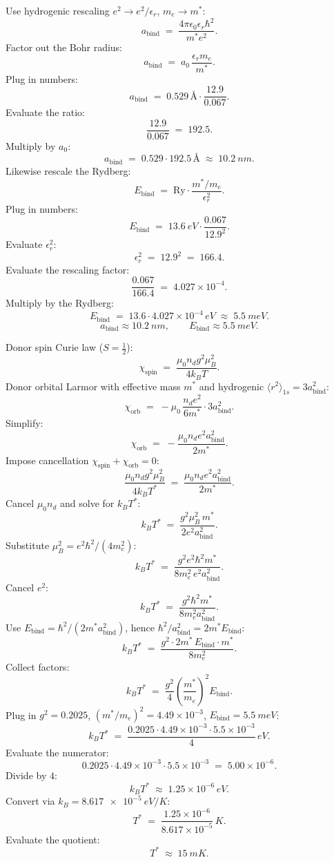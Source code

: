 \documentclass[11pt]{article}
\newcommand{\kB}{k_{B}}
\begin{document}
Use hydrogenic rescaling $e^2\to e^2/\epsilon_r$, $m_e\to m^*$:
\[
a_{\text{bind}} \;=\; \frac{4\pi\epsilon_0\epsilon_r\hbar^2}{m^* e^2}.
\]
Factor out the Bohr radius:
\[
a_{\text{bind}} \;=\; a_0\,\frac{\epsilon_r m_e}{m^*}.
\]
Plug in numbers:
\[
a_{\text{bind}} \;=\; 0.529\,\si{\angstrom}\cdot\frac{12.9}{0.067}.
\]
Evaluate the ratio:
\[
\frac{12.9}{0.067} \;=\; 192.5.
\]
Multiply by $a_0$:
\[
a_{\text{bind}} \;=\; 0.529\cdot 192.5\,\si{\angstrom} \;\approx\; \SI{10.2}{nm}.
\]
Likewise rescale the Rydberg:
\[
E_{\text{bind}} \;=\; \mathrm{Ry}\cdot\frac{m^*/m_e}{\epsilon_r^2}.
\]
Plug in numbers:
\[
E_{\text{bind}} \;=\; \SI{13.6}{eV}\cdot\frac{0.067}{12.9^2}.
\]
Evaluate $\epsilon_r^2$:
\[
\epsilon_r^2 \;=\; 12.9^2 \;=\; 166.4.
\]
Evaluate the rescaling factor:
\[
\frac{0.067}{166.4} \;=\; 4.027\times 10^{-4}.
\]
Multiply by the Rydberg:
\[
E_{\text{bind}} \;=\; 13.6\cdot 4.027\times 10^{-4}\,\si{eV} \;\approx\; \SI{5.5}{meV}.
\]
\begin{equation}
\boxed{\;a_{\text{bind}}\approx\SI{10.2}{nm},\qquad E_{\text{bind}}\approx\SI{5.5}{meV}.\;}
\label{eq:donor}
\end{equation}

Donor spin Curie law ($S=\tfrac12$):
\[
\chi_{\text{spin}} \;=\; \frac{\mu_0 n_d g^2\mu_B^2}{4\kB T}.
\]
Donor orbital Larmor with effective mass $m^*$ and hydrogenic $\langle r^2\rangle_{1s}=3 a_{\text{bind}}^2$:
\[
\chi_{\text{orb}} \;=\; -\mu_0\,\frac{n_d e^2}{6 m^*}\cdot 3 a_{\text{bind}}^2.
\]
Simplify:
\[
\chi_{\text{orb}} \;=\; -\frac{\mu_0 n_d e^2 a_{\text{bind}}^2}{2 m^*}.
\]
Impose cancellation $\chi_{\text{spin}}+\chi_{\text{orb}}=0$:
\[
\frac{\mu_0 n_d g^2\mu_B^2}{4\kB T^*} \;=\; \frac{\mu_0 n_d e^2 a_{\text{bind}}^2}{2 m^*}.
\]
Cancel $\mu_0 n_d$ and solve for $\kB T^*$:
\[
\kB T^* \;=\; \frac{g^2\mu_B^2\, m^*}{2 e^2 a_{\text{bind}}^2}.
\]
Substitute $\mu_B^2=e^2\hbar^2/(4 m_e^2)$:
\[
\kB T^* \;=\; \frac{g^2 e^2\hbar^2 m^*}{8 m_e^2\, e^2 a_{\text{bind}}^2}.
\]
Cancel $e^2$:
\[
\kB T^* \;=\; \frac{g^2\hbar^2 m^*}{8 m_e^2 a_{\text{bind}}^2}.
\]
Use $E_{\text{bind}}=\hbar^2/(2 m^* a_{\text{bind}}^2)$, hence $\hbar^2/a_{\text{bind}}^2=2 m^* E_{\text{bind}}$:
\[
\kB T^* \;=\; \frac{g^2\cdot 2 m^*\, E_{\text{bind}}\cdot m^*}{8 m_e^2}.
\]
Collect factors:
\begin{equation}
\boxed{\;\kB T^* \;=\; \frac{g^2}{4}\!\left(\frac{m^*}{m_e}\right)^{\!2}E_{\text{bind}}.\;}
\label{eq:Tstar}
\end{equation}
Plug in $g^2=0.2025$, $(m^*/m_e)^2=4.49\times 10^{-3}$, $E_{\text{bind}}=\SI{5.5}{meV}$:
\[
\kB T^* \;=\; \frac{0.2025\cdot 4.49\times 10^{-3}\cdot 5.5\times 10^{-3}}{4}\,\si{eV}.
\]
Evaluate the numerator:
\[
0.2025\cdot 4.49\times 10^{-3}\cdot 5.5\times 10^{-3} \;=\; 5.00\times 10^{-6}.
\]
Divide by $4$:
\[
\kB T^* \;\approx\; 1.25\times 10^{-6}\,\si{eV}.
\]
Convert via $\kB=\SI{8.617e-5}{eV/K}$:
\[
T^* \;=\; \frac{1.25\times 10^{-6}}{8.617\times 10^{-5}}\,\si{K}.
\]
Evaluate the quotient:
\begin{equation}
\boxed{\;T^*\;\approx\;\SI{15}{mK}.\;}
\label{eq:Tnum}
\end{equation}
\end{document}
